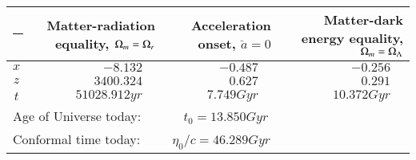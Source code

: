 \begin{tabular}{l rrr}
  \toprule
   \rule{-10ex}{5ex} & \multicolumn{1}{b{2.55cm}}{Matter-radiation equality, $\Omega_{m}=\Omega_{r}$} & \multicolumn{1}{b{1.75cm}}{Acceleration onset, $\ddot{a}=0$} & \multicolumn{1}{b{2.7cm}}{Matter-dark energy equality, $\Omega_{m}=\Omega_{\Lambda}$}  \\ [0.5ex]
  \midrule
  \multicolumn{1}{c|}{\rule{0pt}{2ex} $x\:$} & $-8.132\quad$             & $-0.487\quad$           & $-0.256\quad$            \\ [0.5ex]
  \multicolumn{1}{c|}{$z\:$}                 & $3400.324\quad$           &  $0.627\quad$            & $0.291\quad$             \\ [0.5ex]
  \multicolumn{1}{c|}{$t\:$}                 & $51028.912\unit{yr}\quad$ & $7.749\unit{Gyr}\quad$  & $10.372\unit{Gyr}\quad$  \\ [0.5ex]
  \midrule
  \midrule
  \multicolumn{4}{l}{\rule{0pt}{3ex} Age of Universe today: $\qquad\quad t_0=13.850\unit{Gyr}$} \\ 
  \multicolumn{4}{l}{\rule{0pt}{3ex} Conformal time today: $\qquad\, \eta_0 / c = 46.289\unit{Gyr}$} \\ [1ex]
  \bottomrule
  \end{tabular}
  
